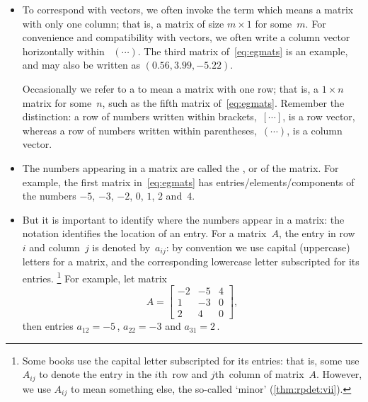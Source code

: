 \begin{itemize}
\item To correspond with vectors,  we often invoke the term  which means a matrix with only one column; that is, a matrix of size \(m\times 1\) for some~\(m\).
For convenience and compatibility with vectors, we often write a column vector horizontally within ~\((\cdots )\).
The third matrix of~\eqref{eq:egmats} is an example, and may also be written as \((0.56,3.99,-5.22)\).

Occasionally we refer to a  to mean a matrix with one row; that is, a \(1\times n\) matrix for some~\(n\), such as the fifth matrix of~\eqref{eq:egmats}.  
Remember the distinction: a row of numbers written within brackets,~\([\cdots]\), is a row vector, whereas a row of numbers written within parentheses,~\((\cdots)\), is a column vector.

\item The numbers appearing in a matrix are called the ,  or  of the matrix.  
For example, the first matrix in~\eqref{eq:egmats} has entries\slash elements\slash components of the numbers \(-5\), \(-3\), \(-2\), \(0\), \(1\), \(2\) and~\(4\).

\item But it is important to identify where the numbers appear in a matrix:  the  notation identifies the location of an entry.
For a matrix~\(A\), the entry in row~\(i\) and column~\(j\) is denoted by~\(a_{ij}\):
by convention we use capital (uppercase) letters for a matrix, and the corresponding lowercase letter subscripted for its entries.%
\footnote{Some books use the capital letter subscripted for its entries: that is, some use \(A_{ij}\) to denote the entry in the \(i\)th~row and \(j\)th~column of matrix~\(A\).  
However, we use \(A_{ij}\) to mean something else, the so-called `minor' (\autoref{thm:rpdet:vii}).}
For example, let matrix
\begin{equation*}
A=\begin{bmatrix}   -2 & -5 & 4
\\ 1 & -3 & 0
\\ 2 & 4 & 0 \end{bmatrix},
\end{equation*}
then entries \(a_{12}=-5\)\,, \(a_{22}=-3\) and \(a_{31}=2\)\,.

\end{itemize}
